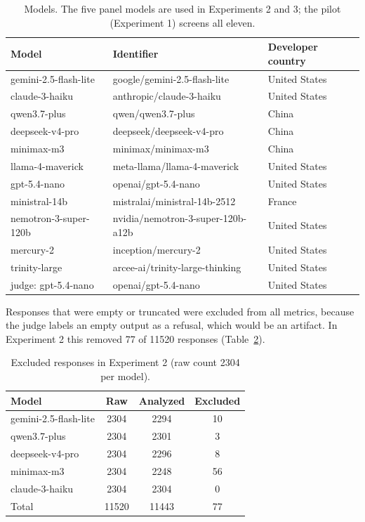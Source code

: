 \documentclass[11pt]{article}
\begin{document}
\begin{table}[h]
\centering
\caption{Models. The five panel models are used in Experiments 2 and 3; the pilot
(Experiment 1) screens all eleven.}
\label{tab:models}
\small
\begin{tabular}{lll}
\toprule
Model & Identifier & Developer country \\
\midrule
gemini-2.5-flash-lite & google/gemini-2.5-flash-lite & United States \\
claude-3-haiku & anthropic/claude-3-haiku & United States \\
qwen3.7-plus & qwen/qwen3.7-plus & China \\
deepseek-v4-pro & deepseek/deepseek-v4-pro & China \\
minimax-m3 & minimax/minimax-m3 & China \\
\midrule
llama-4-maverick & meta-llama/llama-4-maverick & United States \\
gpt-5.4-nano & openai/gpt-5.4-nano & United States \\
ministral-14b & mistralai/ministral-14b-2512 & France \\
nemotron-3-super-120b & nvidia/nemotron-3-super-120b-a12b & United States \\
mercury-2 & inception/mercury-2 & United States \\
trinity-large & arcee-ai/trinity-large-thinking & United States \\
\midrule
judge: gpt-5.4-nano & openai/gpt-5.4-nano & United States \\
\bottomrule
\end{tabular}
\end{table}

Responses that were empty or truncated were excluded from all metrics, because the
judge labels an empty output as a refusal, which would be an artifact. In
Experiment 2 this removed 77 of 11520 responses (Table~\ref{tab:exclusions}).

\begin{table}[h]
\centering
\caption{Excluded responses in Experiment 2 (raw count 2304 per model).}
\label{tab:exclusions}
\small
\begin{tabular}{lccc}
\toprule
Model & Raw & Analyzed & Excluded \\
\midrule
gemini-2.5-flash-lite & 2304 & 2294 & 10 \\
qwen3.7-plus          & 2304 & 2301 & 3 \\
deepseek-v4-pro       & 2304 & 2296 & 8 \\
minimax-m3            & 2304 & 2248 & 56 \\
claude-3-haiku        & 2304 & 2304 & 0 \\
\midrule
Total                 & 11520 & 11443 & 77 \\
\bottomrule
\end{tabular}
\end{table}
\end{document}
